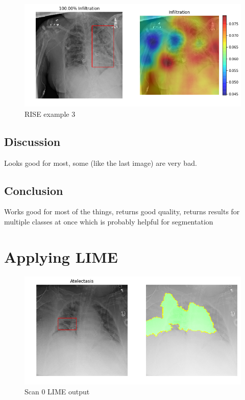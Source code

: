\begin{figure}[h]
\centering
\caption{RISE example 3}
\includegraphics[width=12cm]{chapters/03_classification/images/rise_8.png}
\end{figure}

\subsection{Discussion}
Looks good for most, some (like the last image) are very bad.

\subsection{Conclusion}
Works good for most of the things, returns good quality, returns results for multiple classes at once which is probably helpful for segmentation

\section{Applying LIME}


\begin{figure}[h]
\centering
\caption{Scan 0 LIME output}
\includegraphics[width=12cm]{chapters/03_classification/images/lime_0.png}
\end{figure}

